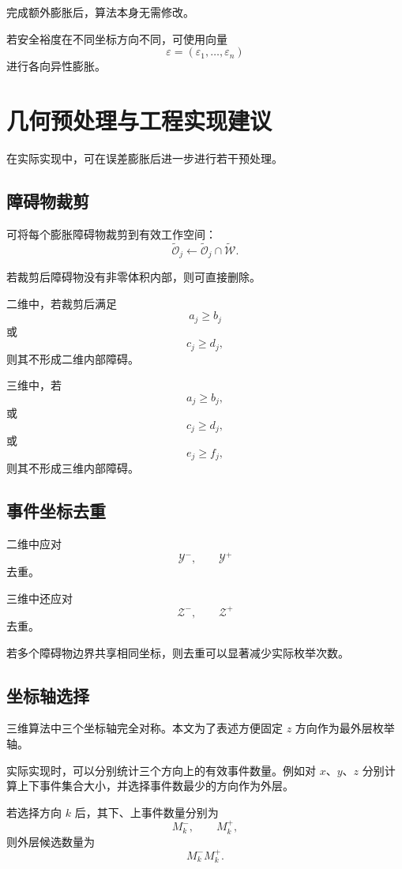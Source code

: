 \documentclass[UTF8,12pt,a4paper]{ctexart}
\begin{document}
完成额外膨胀后，算法本身无需修改。

若安全裕度在不同坐标方向不同，可使用向量
\[
\varepsilon=(\varepsilon_1,\ldots,\varepsilon_n)
\]
进行各向异性膨胀。

\section{几何预处理与工程实现建议}

在实际实现中，可在误差膨胀后进一步进行若干预处理。

\subsection{障碍物裁剪}

可将每个膨胀障碍物裁剪到有效工作空间：
\begin{equation}
    \widetilde{\mathcal O}_j
    \leftarrow
    \widetilde{\mathcal O}_j
    \cap
    \widetilde{\mathcal W}.
\end{equation}

若裁剪后障碍物没有非零体积内部，则可直接删除。

二维中，若裁剪后满足
\[
a_j\ge b_j
\]
或
\[
c_j\ge d_j,
\]
则其不形成二维内部障碍。

三维中，若
\[
a_j\ge b_j,
\]
或
\[
c_j\ge d_j,
\]
或
\[
e_j\ge f_j,
\]
则其不形成三维内部障碍。

\subsection{事件坐标去重}

二维中应对
\[
\mathcal Y^-,
\qquad
\mathcal Y^+
\]
去重。

三维中还应对
\[
\mathcal Z^-,
\qquad
\mathcal Z^+
\]
去重。

若多个障碍物边界共享相同坐标，则去重可以显著减少实际枚举次数。

\subsection{坐标轴选择}

三维算法中三个坐标轴完全对称。本文为了表述方便固定 $z$ 方向作为最外层枚举轴。

实际实现时，可以分别统计三个方向上的有效事件数量。例如对 $x$、$y$、$z$ 分别计算上下事件集合大小，并选择事件数最少的方向作为外层。

若选择方向 $k$ 后，其下、上事件数量分别为
\[
M_k^-,
\qquad
M_k^+,
\]
则外层候选数量为
\[
M_k^-M_k^+.
\]
\end{document}
